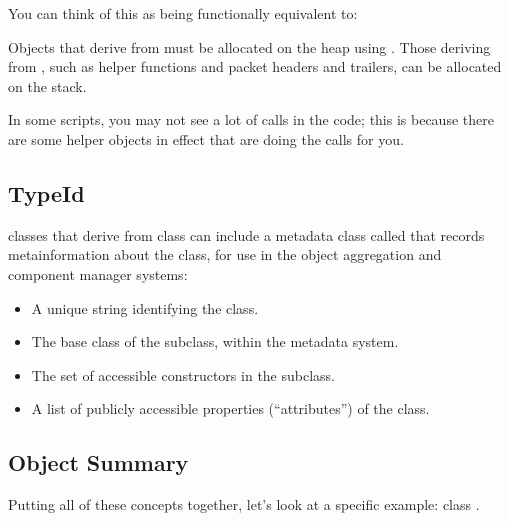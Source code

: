 \documentclass[letterpaper,10pt,english]{sphinxmanual}
\renewcommand{\sphinxcode}[1]{\texttt{\small{#1}}}
\begin{document}
You can think of this as being functionally equivalent to:

\begin{sphinxVerbatim}[commandchars=\\\{\}]
     
\end{sphinxVerbatim}

Objects that derive from \sphinxcode{} must be allocated on the heap
using \sphinxcode{}. Those deriving from \sphinxcode{},
such as  helper functions and packet headers and trailers,
can be allocated on the stack.

In some scripts, you may not see a lot of \sphinxcode{} calls
in the code; this is because there are some helper objects in effect
that are doing the \sphinxcode{} calls for you.


\subsection{TypeId}
\label{\detokenize{attributes:typeid}}
 classes that derive from class \sphinxcode{} can include
a metadata class called \sphinxcode{} that records meta\sphinxhyphen{}information
about the class, for use in the object aggregation and component manager
systems:
\begin{itemize}
\item {} 
A unique string identifying the class.

\item {} 
The base class of the subclass, within the metadata system.

\item {} 
The set of accessible constructors in the subclass.

\item {} 
A list of publicly accessible properties (“attributes”) of the class.

\end{itemize}


\subsection{Object Summary}
\label{\detokenize{attributes:object-summary}}
Putting all of these concepts together, let’s look at a specific
example: class \sphinxcode{}.
\end{document}
